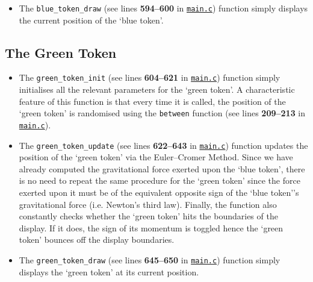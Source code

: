 \documentclass[11pt]{article}
\newcommand{\lineref}[1]{lines \textbf{#1}}
\begin{document}
\begin{itemize}
    Secondly, the function checks if the position of the `blue token' at any point in time touches the boundaries of the display. If so, the sign of its momentum parameter is flipped and hence bounces off the screen. 
    Lastly, the function checks whether the `blue token' has collided with any `anti-tokens'. This is assessed using a collision detection function called \texttt{collide} (see \lineref{230--242} in \hyperref[app:main-c]{\texttt{main.c}}), which checks whether the bounded rectangular values of one object is within the boundaries of the bounded rectangular values of another object by testing various inequalities. If the \texttt{collide} function returns \texttt{true}, the collided `anti-token' disappears and the `blue token' returns to the tip position of the arrow. \item The \texttt{blue\_token\_draw} (see \lineref{594--600} in \hyperref[app:main-c]{\texttt{main.c}}) function simply displays the current position of the `blue token'.
\end{itemize}


\subsection{The Green Token}

\begin{itemize}
    \item The \texttt{green\_token\_init} (see \lineref{604--621} in \hyperref[app:main-c]{\texttt{main.c}}) function simply initialises all the relevant parameters for the `green token'. A characteristic feature of this function is that every time it is called, the position of the `green token' is randomised using the \texttt{between} function (see \lineref{209--213} in \hyperref[app:main-c]{\texttt{main.c}}).
    \item The \texttt{green\_token\_update} (see \lineref{622--643} in \hyperref[app:main-c]{\texttt{main.c}}) function updates the position of the `green token' via the Euler--Cromer Method. Since we have already computed the gravitational force exerted upon the `blue token', there is no need to repeat the same procedure for the `green token' since the force exerted upon it must be of the equivalent opposite sign of the `blue token''s gravitational force (i.e. Newton's third law). Finally, the function also constantly checks whether the `green token' hits the boundaries of the display. If it does, the sign of its momentum is toggled hence the `green token' bounces off the display boundaries. 
    \item The \texttt{green\_token\_draw} (see \lineref{645--650} in \hyperref[app:main-c]{\texttt{main.c}}) function simply displays the `green token' at its current position. 
\end{itemize}
\end{document}
